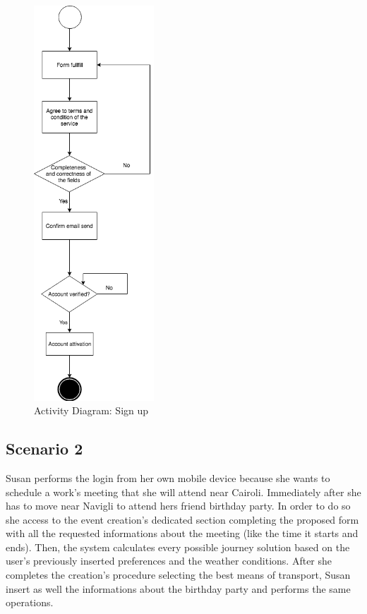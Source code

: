 \documentclass[numbers=noenddot, 12pt, a4paper, oneside]{scrbook}
\begin{document}
\begin{figure}[H]
	\centering
	\includegraphics[width=0.4\textwidth]{flows/Scenario1}
	\caption{Activity Diagram: Sign up}
\end{figure}

\newpage
\subsection*{Scenario 2}

Susan performs the login from her own mobile device because she wants to schedule a work's meeting that she will attend near Cairoli. Immediately after she has to move near Navigli to attend hers friend birthday party. In order to do so she access to the event creation's dedicated section completing the proposed form with all the requested informations about the meeting (like the time it starts and ends). Then, the system calculates every possible journey solution based on the user's previously inserted preferences and the weather conditions. After she completes the creation's procedure selecting the best means of transport, Susan insert as well the informations about the birthday party and performs the same operations.
\\
\end{document}
